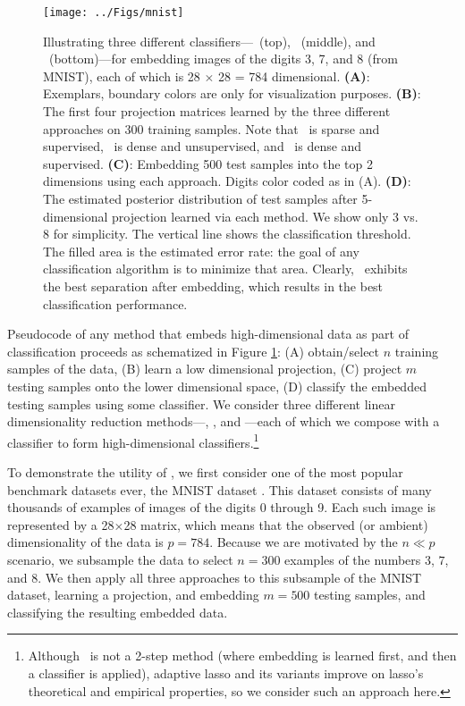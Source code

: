 \documentclass[10pt]{article}
\begin{document}
\begin{figure}
\centering %
\texttt{[image: ../Figs/mnist]}
\caption{
Illustrating three different classifiers---~(top), ~(middle), and \Lol~(bottom)---for embedding images of the digits 3, 7, and 8 (from MNIST), each of which is 28 $\times$ 28 = 784 dimensional.  
\textbf{(A)}: Exemplars, boundary colors are only for visualization purposes.
\textbf{(B)}: The first four projection matrices learned by the three different approaches on 300 training samples. Note that ~is sparse and supervised, \Pca~is dense and unsupervised, and \Lol~is dense and supervised.
\textbf{(C)}: Embedding 500 test samples into the top 2 dimensions using each approach.  Digits color coded as in (A).
\textbf{(D)}:  The estimated posterior distribution of test samples after 
5-dimensional projection learned via each method.  
We show only 3 vs. 8 for simplicity.
The vertical line shows the classification threshold.
The filled area is the estimated error rate: the goal of any classification algorithm is to minimize that area. 
Clearly, \Lol~exhibits the best separation after embedding, which results in the best classification performance.
}
\label{f:mnist}
\end{figure}

Pseudocode of any method that embeds high-dimensional data as part of classification proceeds as schematized in Figure \ref{f:mnist}: 
(A) obtain/select $n$ training samples of the data, 
(B) learn a low dimensional projection, 
(C) project $m$ testing samples onto the lower dimensional space, 
(D) classify the embedded testing samples using some classifier.  
We consider  three different linear dimensionality reduction methods---, \Pca, and \Lol---each of which we compose with a classifier to form high-dimensional classifiers.\footnote{Although ~is not a 2-step method (where embedding is learned first, and then a classifier is applied), adaptive lasso \cite{Zou2006a} and its variants improve on lasso's theoretical and empirical properties, so we consider such an approach here.}

To demonstrate the utility of \Lol, we  first consider one of the most popular benchmark datasets ever, the MNIST dataset \cite{mnist}.  This dataset consists of many thousands of examples of images of the digits 0 through 9.  Each such image is represented by a 28$\times$28 matrix, which means that the observed (or ambient) dimensionality of the data is $p=784$.  Because we are motivated by the $n \ll p$ scenario, we subsample the data to select $n=300$ examples of the numbers $3$, $7$, and $8$. We then apply all three approaches to this subsample of the MNIST dataset, learning a projection, and embedding $m=500$ testing samples, and classifying the resulting embedded data.
\end{document}
